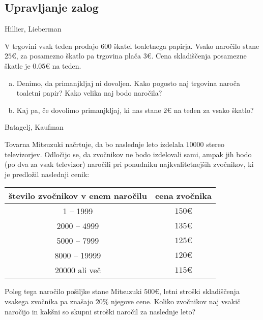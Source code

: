\subsection{Upravljanje zalog}

\begin{naloga}{Hillier, Lieberman}{\cite[Problem~19.3-2]{hl}}
\begin{vprasanje}[toaletni]
V trgovini vsak teden prodajo $600$ škatel toaletnega papirja.
Vsako naročilo stane $25 €$, za posamezno škatlo pa trgovina plača $3 €$.
Cena skladiščenja posamezne škatle je $0.05 €$ na teden.
\begin{enumerate}[(a)]
\item Denimo, da primanjkljaj ni dovoljen.
Kako pogosto naj trgovina naroča toaletni papir?
Kako velika naj bodo naročila?
\item Kaj pa, če dovolimo primanjkljaj,
ki nas stane $2 €$ na teden za vsako škatlo?
\end{enumerate}

\end{vprasanje}
\begin{odgovor}
\end{odgovor}
\end{naloga}


\begin{naloga}{Batagelj, Kaufman}{\cite[Naloga~10.7]{bk}}
\begin{vprasanje}[mitsuzuki]
Tovarna Mitsuzuki načrtuje,
da bo naslednje leto izdelala $10000$ stereo televizorjev.
Odločijo se, da zvočnikov ne bodo izdelovali sami,
ampak jih bodo (po dva za vsak televizor) naročili
pri ponudniku najkvalitetnejših zvočnikov,
ki je predložil naslednji cenik:
\begin{center}
\begin{tabular}{c|c}
število zvočnikov v enem naročilu & cena zvočnika \\
\hline
1 -- 1999 & $150 €$ \\
2000 -- 4999 & $135 €$ \\
5000 -- 7999 & $125 €$ \\
8000 -- 19999 & $120 €$ \\
20000 ali več & $115 €$ \\
\end{tabular}
\end{center}
Poleg tega naročilo pošiljke stane Mitsuzuki $500 €$,
letni stroški skladiščenja vsakega zvočnika pa znašajo $20\%$ njegove cene.
Koliko zvočnikov naj vsakič naročijo
in kakšni so skupni stroški naročil za naslednje leto?

\end{vprasanje}
\begin{odgovor}
\end{odgovor}
\end{naloga}


